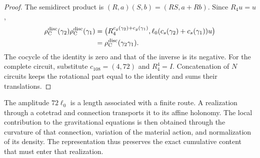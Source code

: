 \begin{proof}
The semidirect product is
\((R,a)(S,b)=(RS,a+Rb)\). Since \(R_4u=u\),
\[
\begin{split}
 \rho_{\rm C}^{\rm disc}(\gamma_2)
 \rho_{\rm C}^{\rm disc}(\gamma_1)
 &=
 \bigl(R_4^{c_g(\gamma_2)+c_g(\gamma_1)},
 \ell_0(c_s(\gamma_2)+c_s(\gamma_1))u\bigr)\\
 &=\rho_{\rm C}^{\rm disc}(\gamma_2\gamma_1).
\end{split}
\]
The cocycle of the identity is zero and that of the inverse is its negative.
For the complete circuit, substitute \(c_{108}=(4,72)\) and
\(R_4^4=I\). Concatenation of \(N\) circuits keeps the rotational
part equal to the identity and sums their translations.
\end{proof}

The amplitude \(72\ell_0\) is a length associated with a finite route.
A realization through a cotetrad and connection transports it to its
affine holonomy. The local contribution to the gravitational equations
is then obtained through the curvature of that connection,
variation of the material action, and normalization of its density.
The representation thus preserves the exact cumulative content
that must enter that realization.
